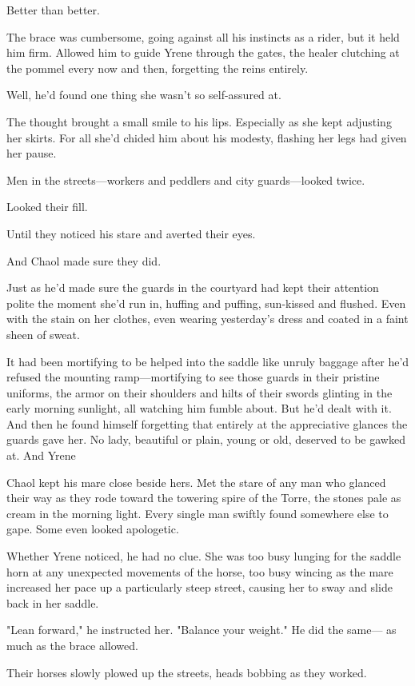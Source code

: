 Better than better.

The brace was cumbersome, going against all his instincts as a rider, but  it held him firm. Allowed him to guide Yrene through the gates, the healer clutching at the pommel every now and then, forgetting the reins entirely.

Well, he'd found one thing she wasn't so self-assured at.

The thought brought a small smile to his lips. Especially as she kept adjusting her skirts. For all she'd chided him about his modesty, flashing her legs had given her pause.

Men in the streets---workers and peddlers and city guards---looked twice.

Looked their fill.

Until they noticed his stare and averted their eyes.

And Chaol made sure they did.

Just as he'd made sure the guards in the courtyard had kept their attention polite the moment she'd run in, huffing and puffing, sun-kissed and flushed. Even with the stain on her clothes, even wearing yesterday's dress and coated in a faint sheen of sweat.

It had been mortifying to be helped into the saddle like unruly baggage after he'd refused the mounting ramp---mortifying to see those guards in their pristine uniforms, the armor on their shoulders and hilts of their swords glinting in the early morning sunlight, all watching him fumble about. But he'd dealt with it. And then he found himself forgetting that entirely at the appreciative glances the guards gave her. No lady, beautiful or plain, young or old, deserved to be gawked at. And Yrene


Chaol kept his mare close beside hers. Met the stare of any man who glanced their way as they rode toward the towering spire of the Torre, the stones pale as cream in the morning light. Every single man swiftly found somewhere else to gape. Some even looked apologetic.

Whether Yrene noticed, he had no clue. She was too busy lunging for the saddle horn at any unexpected movements of the horse, too busy wincing as the mare increased her pace up a particularly steep street, causing her to sway and slide back in her saddle.

"Lean forward," he instructed her. "Balance your weight." He did the same--- as much as the brace allowed.

Their horses slowly plowed up the streets, heads bobbing as they worked.


